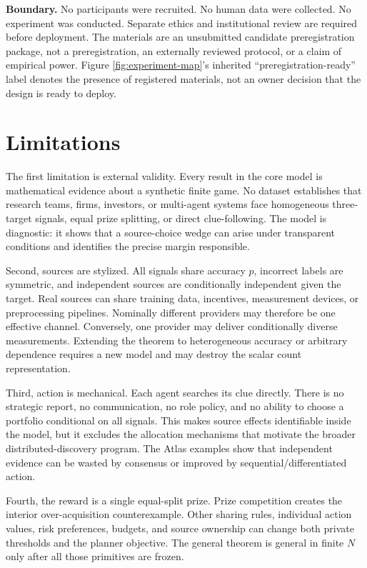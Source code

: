 \documentclass[11pt]{article}
\newcommand{\Boundary}[1]{\par\noindent\textbf{Boundary.} #1\par}
\begin{document}
\Boundary{No participants were recruited. No human data were collected. No
experiment was conducted. Separate ethics and institutional review are required
before deployment. The materials are an unsubmitted candidate preregistration
package, not a preregistration, an externally reviewed protocol, or a claim of
empirical power. Figure \ref{fig:experiment-map}'s inherited
``preregistration-ready'' label denotes the presence of registered materials,
not an owner decision that the design is ready to deploy.}

\section{Limitations}

The first limitation is external validity. Every result in the core model is
mathematical evidence about a synthetic finite game. No dataset establishes that
research teams, firms, investors, or multi-agent systems face homogeneous
three-target signals, equal prize splitting, or direct clue-following. The model
is diagnostic: it shows that a source-choice wedge can arise under transparent
conditions and identifies the precise margin responsible.

Second, sources are stylized. All signals share accuracy $p$, incorrect labels
are symmetric, and independent sources are conditionally independent given the
target. Real sources can share training data, incentives, measurement devices,
or preprocessing pipelines. Nominally different providers may therefore be one
effective channel. Conversely, one provider may deliver conditionally diverse
measurements. Extending the theorem to heterogeneous accuracy or arbitrary
dependence requires a new model and may destroy the scalar count representation.

Third, action is mechanical. Each agent searches its clue directly. There is no
strategic report, no communication, no role policy, and no ability to choose a
portfolio conditional on all signals. This makes source effects identifiable
inside the model, but it excludes the allocation mechanisms that motivate the
broader distributed-discovery program. The Atlas examples show that independent
evidence can be wasted by consensus or improved by sequential/differentiated
action.

Fourth, the reward is a single equal-split prize. Prize competition creates the
interior over-acquisition counterexample. Other sharing rules, individual action
values, risk preferences, budgets, and source ownership can change both private
thresholds and the planner objective. The general theorem is general in finite
$N$ only after all those primitives are frozen.
\end{document}
